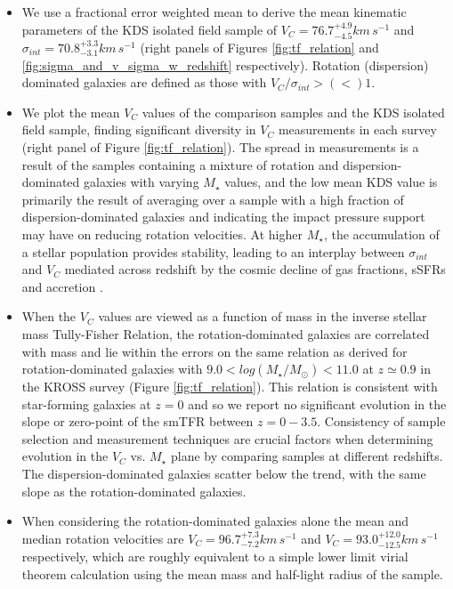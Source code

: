 \documentclass[fleqn,usenatbib]{mnras}
\begin{document}
\begin{itemize}
    \item We use a fractional error weighted mean to derive the mean kinematic parameters of the KDS isolated field sample of $V_{C} = 76.7^{+4.9}_{-4.5}km\,s^{-1}$ and $\sigma_{int} = 70.8^{+3.3}_{-3.1} km\,s^{-1}$ (right panels of Figures \ref{fig:tf_relation} and \ref{fig:sigma_and_v_sigma_w_redshift} respectively).
    Rotation (dispersion) dominated galaxies are defined as those with $V_{C}/\sigma_{int} > (<) 1$.  
    \item We plot the mean $V_{C}$ values of the comparison samples and the KDS isolated field sample, finding significant diversity in $V_{C}$ measurements in each survey (right panel of Figure \ref{fig:tf_relation}).
    The spread in measurements is a result of the samples containing a mixture of rotation and dispersion-dominated galaxies with varying $M_{\star}$ values, and the low mean KDS value is primarily the result of averaging over a sample with a high fraction of dispersion-dominated galaxies and indicating the impact pressure support may have on reducing rotation velocities.
    At higher $M_{\star}$, the accumulation of a stellar population provides stability, leading to an interplay between $\sigma_{int}$ and $V_{C}$ mediated across redshift by the cosmic decline of gas fractions, sSFRs and accretion \citep[e.g.][]{Law2012b,Wisnioski2015}.
    \item When the $V_{C}$ values are viewed as a function of mass in the inverse stellar mass Tully-Fisher Relation, the rotation-dominated galaxies are correlated with mass and lie within the errors on the same relation as derived for rotation-dominated galaxies with $9.0 < log(M_{\star}/M_{\odot}) < 11.0$ at $z\simeq0.9$ in the KROSS survey (Figure \ref{fig:tf_relation}). %
    This relation is consistent with star-forming galaxies at $z=0$ and so we report no significant evolution in the slope or zero-point of the smTFR between $z=0-3.5$.
    Consistency of sample selection and measurement techniques are crucial factors when determining evolution in the $V_{C}$ vs. $M_{\star}$ plane by comparing samples at different redshifts.
    The dispersion-dominated galaxies scatter below the trend, with the same slope as the rotation-dominated galaxies.
    \item When considering the rotation-dominated galaxies alone the mean and median rotation velocities are $V_{C} = 96.7^{+7.3}_{-7.2}km\,s^{-1}$ and $V_{C} = 93.0^{+12.0}_{-12.5}km\,s^{-1}$ respectively, which are roughly equivalent to a simple lower limit virial theorem calculation using the mean mass and half-light radius of the sample.

\end{itemize}
\end{document}
